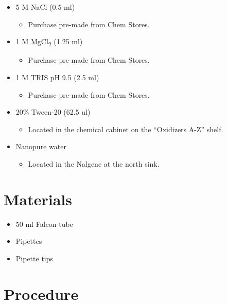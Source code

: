 \documentclass[
  letterpaper,
  DIV=11,
  numbers=noendperiod]{scrreprt}
\providecommand{\tightlist}{%
  \setlength{\itemsep}{0pt}\setlength{\parskip}{0pt}}\usepackage{longtable,booktabs,array}
\begin{document}
\begin{itemize}
\tightlist
\item
  5 M NaCl (0.5 ml)

  \begin{itemize}
  \tightlist
  \item
    Purchase pre-made from Chem Stores.
  \end{itemize}
\item
  1 M MgCl\textsubscript{2} (1.25 ml)

  \begin{itemize}
  \tightlist
  \item
    Purchase pre-made from Chem Stores.
  \end{itemize}
\item
  1 M TRIS pH 9.5 (2.5 ml)

  \begin{itemize}
  \tightlist
  \item
    Purchase pre-made from Chem Stores.
  \end{itemize}
\item
  20\% Tween-20 (62.5 ul)

  \begin{itemize}
  \tightlist
  \item
    Located in the chemical cabinet on the ``Oxidizers A-Z'' shelf.
  \end{itemize}
\item
  Nanopure water

  \begin{itemize}
  \tightlist
  \item
    Located in the Nalgene at the north sink.
  \end{itemize}
\end{itemize}

\hypertarget{materials-102}{%
\section{Materials}\label{materials-102}}

\begin{itemize}
\tightlist
\item
  50 ml Falcon tube
\item
  Pipettes
\item
  Pipette tips
\end{itemize}

\hypertarget{procedure-101}{%
\section{Procedure}\label{procedure-101}}
\end{document}
